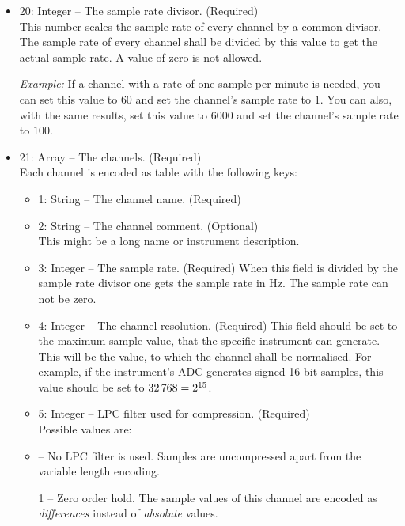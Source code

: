 \documentclass[DIV=10]{scrartcl}
\renewenvironment{quote}
{\list{}{
  \setlength{\rightmargin}{0cm}
  \setlength{\leftmargin}{0.75cm}}%
\item\relax\ignorespaces}
{\unskip\unskip\endlist}
\begin{document}
\begin{itemize}
  \item 20: Integer – The sample rate divisor. (Required)\\
  This number scales the sample rate of every channel by a common divisor.
  The sample rate of every channel shall be divided by this value to get the actual sample rate.
  A value of zero is not allowed.

  \emph{Example:} If a channel with a rate of one sample per minute is needed, you can set this value to \(60\) and set the channel’s sample rate to \(1\).
  You can also, with the same results, set this value to \(6000\) and set the channel’s sample rate to \(100\).
  \item 21: Array – The channels. (Required)\\
  Each channel is encoded as table with the following keys:
  \begin{itemize}
    \item 1: String – The channel name. (Required)
    \item 2: String – The channel comment. (Optional)\\
    This might be a long name or instrument description.
    \item 3: Integer – The sample rate. (Required)
    When this field is divided by the sample rate divisor one gets the sample rate in Hz.
    The sample rate can not be zero.
    \item 4: Integer – The channel resolution. (Required)
    This field should be set to the maximum sample value, that the specific instrument can generate.
    This will be the value, to which the channel shall be normalised.
    For example, if the instrument’s ADC generates signed 16 bit samples, this value should be set to \(32\text{\,}768 = 2^{15}\).
    \item 5: Integer – LPC filter used for compression. (Required)\\
    Possible values are:
    \begin{quote}
      0 – No LPC filter is used.
      Samples are uncompressed apart from the variable length encoding.

      1 – Zero order hold.
      The sample values of this channel are encoded as \emph{differences} instead of \emph{absolute} values.


\end{quote}
\end{itemize}
\end{itemize}
\end{document}

